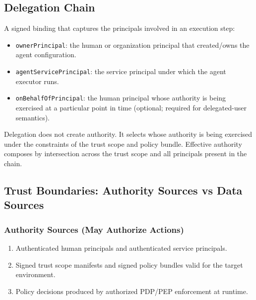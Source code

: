 \documentclass[11pt]{article}
\begin{document}
\hypertarget{delegation-chain}{%
\subsection{Delegation Chain}\label{delegation-chain}}

A signed binding that captures the principals involved in an execution
step:

\begin{itemize}
\tightlist
\item
  \texttt{ownerPrincipal}: the human or organization principal that
  created/owns the agent configuration.
\item
  \texttt{agentServicePrincipal}: the service principal under which the
  agent executor runs.
\item
  \texttt{onBehalfOfPrincipal}: the human principal whose authority is
  being exercised at a particular point in time (optional; required for
  delegated-user semantics).
\end{itemize}

Delegation does not create authority. It selects whose authority is
being exercised under the constraints of the trust scope and policy
bundle. Effective authority composes by intersection across the trust
scope and all principals present in the chain.

\hypertarget{trust-boundaries-authority-sources-vs-data-sources}{%
\subsection{Trust Boundaries: Authority Sources vs Data Sources}\label{trust-boundaries-authority-sources-vs-data-sources}}

\hypertarget{authority-sources-may-authorize-actions}{%
\subsubsection{Authority Sources (May Authorize Actions)}\label{authority-sources-may-authorize-actions}}

\begin{enumerate}
\def\labelenumi{\arabic{enumi}.}
\tightlist
\item
  Authenticated human principals and authenticated service principals.
\item
  Signed trust scope manifests and signed policy bundles valid for the
  target environment.
\item
  Policy decisions produced by authorized PDP/PEP enforcement at
  runtime.
\end{enumerate}
\end{document}
